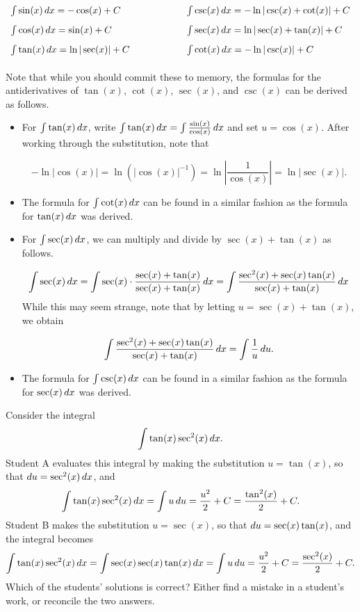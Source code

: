 \documentclass[noauthor]{ximera}
\begin{document}
\begin{freeResponse}
\[
\begin{array}{ll}
\int \sin(x) \mathop{}\!d x = -\cos(x)+C \qquad \qquad \qquad & \int \csc(x) \mathop{}\!d x = -\ln|\csc(x)+\cot(x)|+C \\ [2 ex]
\int \cos(x) \mathop{}\!d x =\sin(x)+C \qquad & \int \sec(x) \mathop{}\!d x = \ln|\sec(x)+\tan(x)| +C \\ [2 ex]
\int \tan(x) \mathop{}\!d x =\ln|\sec(x)|+C \qquad & \int \cot(x) \mathop{}\!d x = -\ln|\csc(x)|+C \\ [2 ex]
\end{array}
\]
Note that while you should commit these to memory, the formulas for the antiderivatives of $\tan(x)$, $\cot(x)$, $\sec(x)$, and $\csc(x)$ can be derived as follows.

\begin{itemize}
\item For $\int \tan(x) \mathop{}\!d x$, write $\int \tan(x) \mathop{}\!d x = \int\frac{\sin(x)}{\cos(x)} \mathop{}\!d x$ and set $u=\cos(x)$.  After working through the substitution, note that

\[
-\ln|\cos(x)| = \ln\left(|\cos(x)|^{-1}\right) = \ln\left|\frac{1}{\cos(x)}\right| = \ln|\sec(x)|.
\]

\item The formula for $\int \cot(x) \mathop{}\!d x$ can be found in a similar fashion as the formula for $\tan(x) \mathop{}\!d x$ was derived.

\item For $\int \sec(x) \mathop{}\!d x$, we can multiply and divide by $\sec(x) + \tan(x)$ as follows.

\[
\int \sec(x) \mathop{}\!d x = \int \sec(x) \cdot \frac{\sec(x) +\tan(x)}{\sec(x) +\tan(x)} \mathop{}\!d x = \int \frac{\sec^2(x) +\sec(x)\tan(x)}{\sec(x) +\tan(x)} \mathop{}\!d x
\]
While this may seem strange, note that by letting $u = \sec(x) +\tan(x)$, we obtain 

\[
 \int \frac{\sec^2(x) +\sec(x)\tan(x)}{\sec(x) +\tan(x)} \mathop{}\!d x = \int \frac{1}{u} \mathop{}\!d u.
\]

\item The formula for $\int \csc(x) \mathop{}\!d x$ can be found in a similar fashion as the formula for $\sec(x) \mathop{}\!d x$ was derived.

\end{itemize}
\end{freeResponse}

\begin{problem}
Consider the integral
$$
\int \tan (x) \sec^2(x) \mathop{}\!d x.
$$
Student A evaluates this integral by making the substitution $u=\tan(x)$, so that $\mathop{}\!d u = \sec^2 (x) \mathop{}\!d x$, and
$$
\int \tan(x) \sec^2(x) \mathop{}\!d x = \int u \mathop{}\!d u = \frac{u^2}{2} + C = \frac{\tan^2 (x)}{2} + C.
$$
Student B makes the substitution $u = \sec(x)$, so that $\mathop{}\!d u = \sec(x) \tan(x)$, and the integral becomes
$$
\int \tan (x) \sec^2 (x) \mathop{}\!d x = \int \sec(x) \sec (x) \tan (x) \mathop{}\!d x = \int u \mathop{}\!d u = \frac{u^2}{2} +C = \frac{\sec^2(x)}{2} +C.
$$
Which of the students' solutions is correct? Either find a mistake in a student's work, or reconcile the two answers.
\end{problem}
\end{document}
